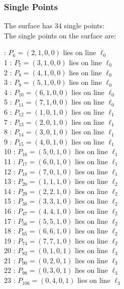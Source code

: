\documentclass{article}
\begin{document}
{\subsubsection*{Single Points}
The surface has 34 single points:\\
The single points on the surface are:\\
\begin{multicols}{2}
 : $P_{6}=( 2, 1, 0, 0 )$ lies on line $\ell_{0}$\\
1 : $P_{7}=( 3, 1, 0, 0 )$ lies on line $\ell_{0}$\\
2 : $P_{8}=( 4, 1, 0, 0 )$ lies on line $\ell_{0}$\\
3 : $P_{9}=( 5, 1, 0, 0 )$ lies on line $\ell_{0}$\\
4 : $P_{10}=( 6, 1, 0, 0 )$ lies on line $\ell_{0}$\\
5 : $P_{11}=( 7, 1, 0, 0 )$ lies on line $\ell_{0}$\\
6 : $P_{12}=( 1, 0, 1, 0 )$ lies on line $\ell_{1}$\\
7 : $P_{13}=( 2, 0, 1, 0 )$ lies on line $\ell_{1}$\\
8 : $P_{14}=( 3, 0, 1, 0 )$ lies on line $\ell_{1}$\\
9 : $P_{15}=( 4, 0, 1, 0 )$ lies on line $\ell_{1}$\\
10 : $P_{16}=( 5, 0, 1, 0 )$ lies on line $\ell_{1}$\\
11 : $P_{17}=( 6, 0, 1, 0 )$ lies on line $\ell_{1}$\\
12 : $P_{18}=( 7, 0, 1, 0 )$ lies on line $\ell_{1}$\\
13 : $P_{20}=( 1, 1, 1, 0 )$ lies on line $\ell_{2}$\\
14 : $P_{29}=( 2, 2, 1, 0 )$ lies on line $\ell_{2}$\\
15 : $P_{38}=( 3, 3, 1, 0 )$ lies on line $\ell_{2}$\\
16 : $P_{47}=( 4, 4, 1, 0 )$ lies on line $\ell_{2}$\\
17 : $P_{56}=( 5, 5, 1, 0 )$ lies on line $\ell_{2}$\\
18 : $P_{65}=( 6, 6, 1, 0 )$ lies on line $\ell_{2}$\\
19 : $P_{74}=( 7, 7, 1, 0 )$ lies on line $\ell_{2}$\\
20 : $P_{82}=( 0, 1, 0, 1 )$ lies on line $\ell_{3}$\\
21 : $P_{90}=( 0, 2, 0, 1 )$ lies on line $\ell_{3}$\\
22 : $P_{98}=( 0, 3, 0, 1 )$ lies on line $\ell_{3}$\\
23 : $P_{106}=( 0, 4, 0, 1 )$ lies on line $\ell_{3}$\\

\end{multicols}}
\end{document}
